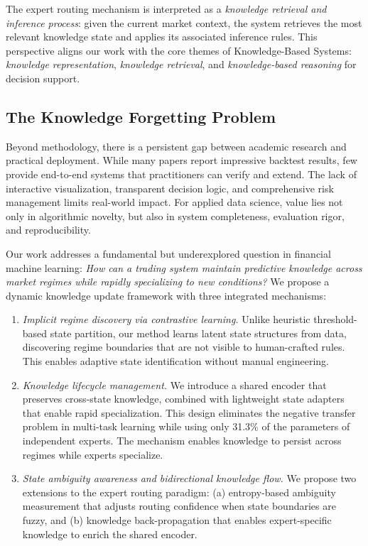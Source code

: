 \documentclass[review]{elsarticle}
\begin{document}
The expert routing mechanism is interpreted as a \textit{knowledge retrieval and inference process}: given the current market context, the system retrieves the most relevant knowledge state and applies its associated inference rules. This perspective aligns our work with the core themes of Knowledge-Based Systems: \textit{knowledge representation}, \textit{knowledge retrieval}, and \textit{knowledge-based reasoning} for decision support.

\subsection{The Knowledge Forgetting Problem}

Beyond methodology, there is a persistent gap between academic research and practical deployment. While many papers report impressive backtest results, few provide end-to-end systems that practitioners can verify and extend. The lack of interactive visualization, transparent decision logic, and comprehensive risk management limits real-world impact. For applied data science, value lies not only in algorithmic novelty, but also in system completeness, evaluation rigor, and reproducibility.

Our work addresses a fundamental but underexplored question in financial machine learning: \textit{How can a trading system maintain predictive knowledge across market regimes while rapidly specializing to new conditions?} We propose a dynamic knowledge update framework with three integrated mechanisms:

\begin{enumerate}
\item \textit{Implicit regime discovery via contrastive learning.} Unlike heuristic threshold-based state partition, our method learns latent state structures from data, discovering regime boundaries that are not visible to human-crafted rules. This enables adaptive state identification without manual engineering.

\item \textit{Knowledge lifecycle management.} We introduce a shared encoder that preserves cross-state knowledge, combined with lightweight state adapters that enable rapid specialization. This design eliminates the negative transfer problem in multi-task learning while using only 31.3\% of the parameters of independent experts. The mechanism enables knowledge to persist across regimes while experts specialize.

\item \textit{State ambiguity awareness and bidirectional knowledge flow.} We propose two extensions to the expert routing paradigm: (a) entropy-based ambiguity measurement that adjusts routing confidence when state boundaries are fuzzy, and (b) knowledge back-propagation that enables expert-specific knowledge to enrich the shared encoder.
\end{enumerate}
\end{document}
